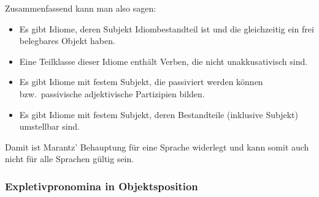 Zusammenfassend kann man also sagen:
\begin{itemize}
\item Es gibt Idiome, deren Subjekt Idiombestandteil ist und die gleichzeitig ein frei belegbares Objekt haben.
\item Eine Teilklasse dieser Idiome enthält Verben, die nicht unakkusativisch sind.
\item Es gibt Idiome mit festem Subjekt, die passiviert werden können bzw.\ passivische adjektivische Partizipien bilden.
\item Es gibt Idiome mit festem Subjekt, deren Bestandteile (inklusive Subjekt) umstellbar sind.
\end{itemize}
Damit ist Marantz' Behauptung für eine Sprache widerlegt und kann somit auch nicht für alle Sprachen gültig sein.

\subsubsection{Expletivpronomina in Objektsposition}
\label{sec-expletivum-in-obj-position}

